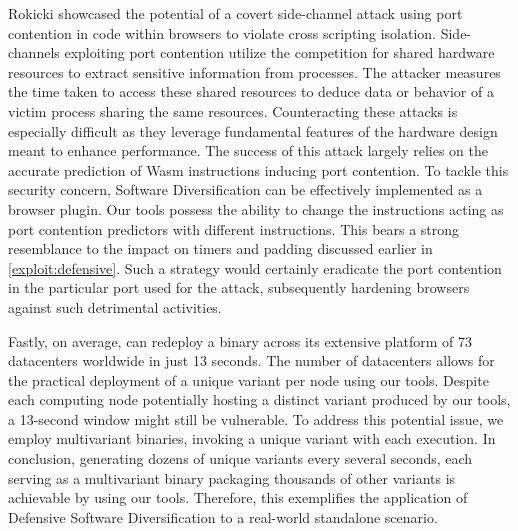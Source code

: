 \begin{strategy}
    Rokicki \etal  \cite{10.1145/3488932.3517411} showcased the potential of a covert side-channel attack using port contention in \Wasm code within browsers to violate cross scripting isolation.
    Side-channels exploiting port contention utilize the competition for shared hardware resources to extract sensitive information from processes. 
    The attacker measures the time taken to access these shared resources to deduce data or behavior of a victim process sharing the same resources. 
    Counteracting these attacks is especially difficult as they leverage fundamental features of the hardware design meant to enhance performance. 
    The success of this attack largely relies on the accurate prediction of Wasm instructions inducing port contention. 
    To tackle this security concern, \Wasm Software Diversification can be effectively implemented as a browser plugin. 
    Our tools possess the ability to change the \Wasm instructions acting as port contention predictors with different instructions. 
    This bears a strong resemblance to the impact on timers and padding discussed earlier in \autoref{exploit:defensive}. 
    Such a strategy would certainly eradicate the port contention in the particular port used for the attack, subsequently hardening browsers against such detrimental activities.

\end{strategy}


\begin{comment}
    
    \wrule{Dataset augmentation:} The \Wasm ecosystem is still in its infancy compared to more mature programming environments. 
    The study by Hilbig \etal  in 2021 found only 8,000 unique \Wasm binaries globally\cite{Hilbig2021AnES}, a fraction of the 1.5 million and 1.7 million packages available in npm and PyPI, respectively. 
    This limited dataset poses challenges for machine learning-based analysis tools, which require extensive data for effective training. 
    The scarcity of \Wasm programs also exacerbates the problem of software monoculture, increasing the risk of compromised \Wasm programs being consumed\cite{usenixWasm2020}. 
\end{comment}

Fastly, on average, can redeploy a \Wasm binary across its extensive platform of 73 datacenters worldwide in just 13 seconds. 
The number of datacenters allows for the practical deployment of a unique variant per node using our tools. 
Despite each computing node potentially hosting a distinct \Wasm variant produced by our tools, a 13-second window might still be vulnerable. 
To address this potential issue, we employ multivariant binaries, invoking a unique variant with each execution. 
In conclusion, generating dozens of unique variants every several seconds, each serving as a multivariant binary packaging thousands of other variants is achievable by using our tools.
Therefore, this exemplifies the application of Defensive Software Diversification to a real-world \Wasm standalone scenario.


